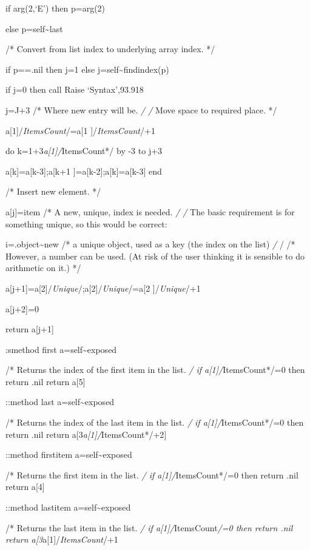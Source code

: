 if arg(2,`E') then p=arg(2)

else p=self\textasciitilde last

/* Convert from list index to underlying array index. */

if p==.nil then j=1 else j=self\textasciitilde findindex(p)

if j=0 then call Raise `Syntax',93.918

j=J+3 /* Where new entry will be. \emph{/ /} Move space to required
place. */

a{[}1{]}/\emph{ItemsCount}/=a{[}1 {]}/\emph{ItemsCount}/+1

do k=1+3\emph{a{[}1{]}/}ItemsCount*/ by -3 to j+3

a{[}k{]}=a{[}k-3{]};a{[}k+1 {]}=a{[}k-2{]};a{[}k{]}=a{[}k-3{]} end

/* Insert new element. */

a{[}j{]}=item /* A new, unique, index is needed. \emph{/ /} The basic
requirement is for something unique, so this would be correct:

i=.object\textasciitilde new /* a unique object, used as a key (the
index on the list) \emph{/ }/ /* However, a number can be used. (At risk
of the user thinking it is sensible to do arithmetic on it.) */

a{[}j+1{]}=a{[}2{]}/\emph{Unique}/;a{[}2{]}/\emph{Unique}/=a{[}2
{]}/\emph{Unique}/+1

a{[}j+2{]}=0

return a{[}j+1{]}

:smethod first a=self\textasciitilde exposed

/* Returns the index of the first item in the list. \emph{/ if
a{[}1{]}/}ItemsCount*/=0 then return .nil return a{[}5{]}

::method last a=self\textasciitilde exposed

/* Returns the index of the last item in the list. \emph{/ if
a{[}1{]}/}ItemsCount*/=0 then return .nil return
a{[}3\emph{a{[}1{]}/}ItemsCount*/+2{]}\textbar{}

::method firstitem a=self\textasciitilde exposed

/* Returns the first item in the list. \emph{/ if
a{[}1{]}/}ItemsCount*/=0 then return .nil return a{[}4{]}

::method lastitem a=self\textasciitilde exposed

/* Returns the last item in the list. \emph{/ if
a{[}1{]}/}ItemsCount\emph{/=0 then return .nil return
a{[}3}a{[}1{]}/\emph{ItemsCount}/+1 \textbar{}

